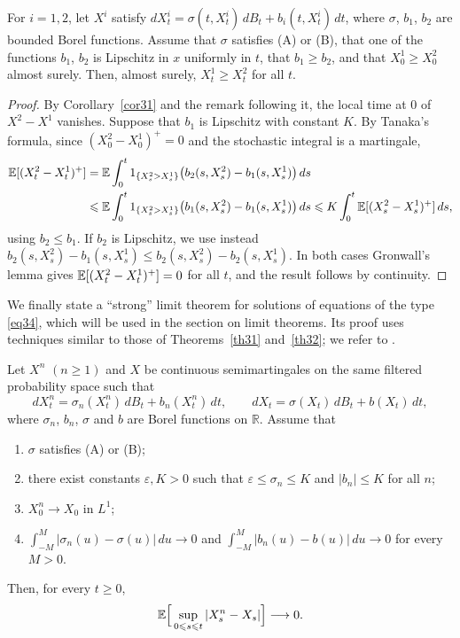 \begin{theorem}\label{th32}
	For $i=1,2$, let $X^i$ satisfy
	$dX_t^i=\sigma (t,X_t^i)\,dB_t + b_i(t,X_t^i)\,dt$, where $\sigma$, $b_1$, $b_2$
	are bounded Borel functions. Assume that $\sigma$ satisfies (A) or (B), that one
	of the functions $b_1$, $b_2$ is Lipschitz in $x$ uniformly in $t$, that
	$b_1 \geqslant b_2$, and that $X_0^1 \geqslant X_0^2$ almost surely. Then, almost
	surely, $X_t^1\geqslant X_t^2$ for all $t$.
\end{theorem}

\begin{proof}
	By Corollary~\ref{cor31} and the remark following it, the local time at $0$ of
	$X^2 - X^1$ vanishes. Suppose that $b_1$ is Lipschitz with constant $K$. By
	Tanaka's formula, since $(X^2_0-X^1_0)^+ = 0$ and the stochastic integral is a
	martingale,
	\begin{align*}
		\mathbb{E}[( X_t^2 - X_t^1)^+] & = \mathbb{E}\int_0^t 1_{\{X_s^2 > X_s^1\}} \big(b_2 (s,X_s^2)-b_1(s,X_s^1)\big)\, ds  \\
		                       & \leqslant \mathbb{E}\int_0^t 1_{\{X_s^2 > X_s^1\}} \big(b_1 (s,X_s^2)-b_1(s,X_s^1)\big)\, ds
		\leqslant K \int_0^t \mathbb{E}[( X_s^2 - X_s^1)^+]\, ds ,
	\end{align*}
	using $b_2\leqslant b_1$. If $b_2$ is Lipschitz, we use instead
	$b_2(s,X^2_s) - b_1(s,X^1_s)\leqslant b_2(s,X^2_s) - b_2(s,X^1_s)$. In both cases
	Gronwall's lemma gives $\mathbb{E}[( X_t^2 - X_t^1)^+]=0$ for all $t$, and the result
	follows by continuity.
\end{proof}

We finally state a ``strong'' limit theorem for solutions of equations of the
type \eqref{eq34}, which will be used in the section on limit theorems. Its
proof uses techniques similar to those of Theorems~\ref{th31} and~\ref{th32};
we refer to \citet{LeGall1984}.

\begin{theorem}\label{th33}
	Let $X^n$ $(n\geqslant 1)$ and $X$ be continuous semimartingales on the same
	filtered probability space such that
	\[
		dX_t^n =\sigma _n(X_t^n)\,dB_t + b_n(X_t^n)\,dt, \qquad
		dX_t =\sigma (X_t)\,dB_t + b(X_t)\,dt,
	\]
	where $\sigma_n$, $b_n$, $\sigma$ and $b$ are Borel functions on $\mathbb{R}$.
	Assume that
	\begin{enumerate}[label=(\roman*)]
		\item $\sigma$ satisfies (A) or (B);
		\item there exist constants $\varepsilon, K>0$ such that
		      $\varepsilon\leqslant \sigma_n \leqslant K$ and $|b_n| \leqslant K$ for all $n$;
		\item $X_0^n \to X_0$ in $L^1$;
		\item $\int_{-M}^{M} |\sigma_n (u)-\sigma(u)|\, du \to 0$ and
		      $\int_{-M}^{M} |b_n (u)-b(u)|\, du \to 0$ for every $M>0$.
	\end{enumerate}
	Then, for every $t\geqslant 0$,
	\[
		\mathbb{E}\Big[\sup_{0\leqslant s\leqslant t}|X_s^n - X_s |\Big]\longrightarrow 0 .
	\]
\end{theorem}

